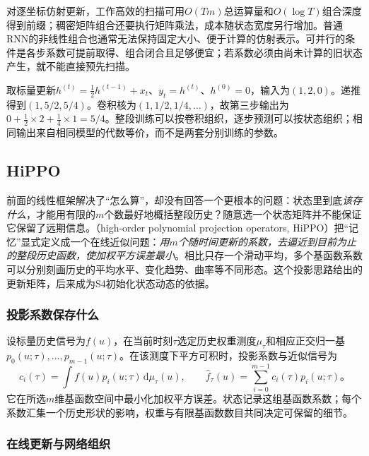 对逐坐标仿射更新，工作高效的扫描可用$O(Tm)$总运算量和$O(\log T)$组合深度得到前缀；稠密矩阵组合还要执行矩阵乘法，成本随状态宽度另行增加。普通RNN的非线性组合也通常无法保持固定大小、便于计算的仿射表示。可并行的条件是各步系数可提前取得、组合闭合且足够便宜；若系数必须由尚未计算的旧状态产生，就不能直接预先扫描。

\begin{example}[同一状态模型的递推与卷积]
  \label{ex:rnn-ssm-equivalence}
  取标量更新$h^{(t)}=\tfrac12 h^{(t-1)}+x_t$、$y_t=h^{(t)}$、$h^{(0)}=0$，输入为$(1,2,0)$。递推得到$(1,5/2,5/4)$。卷积核为$(1,1/2,1/4,\ldots)$，故第三步输出为$0+\tfrac12\times2+\tfrac14\times1=5/4$。整段训练可以按卷积组织，逐步预测可以按状态组织；相同输出来自相同模型的代数等价，而不是两套分别训练的参数。
\end{example}

\subsection{HiPPO}
\label{sec:rnn-hippo}

前面的线性框架解决了“怎么算”，却没有回答一个更根本的问题：状态里到底\emph{该存什么}，才能用有限的$m$个数最好地概括整段历史？随意选一个状态矩阵并不能保证它保留了远期信息。（high-order polynomial projection operators, HiPPO）把“记忆”显式定义成一个在线近似问题：\emph{用$m$个随时间更新的系数，去逼近到目前为止的整段历史函数，使加权平方误差最小}。相比只存一个滑动平均，多个基函数系数可以分别刻画历史的平均水平、变化趋势、曲率等不同形态。这个投影思路给出的更新矩阵，后来成为S4初始化状态动态的依据。

\subsubsection{投影系数保存什么}
\label{sec:rnn-hippo-memory}

设标量历史信号为$f(u)$，在当前时刻$\tau$选定历史权重测度$\mu_\tau$和相应正交归一基$p_0(u;\tau),\ldots,p_{m-1}(u;\tau)$。在该测度下平方可积时，投影系数与近似信号为
\begin{equation}
  c_i(\tau)=\int f(u)p_i(u;\tau)\,\mathrm{d}\mu_\tau(u),
  \qquad
  \widehat f_\tau(u)=\sum_{i=0}^{m-1}c_i(\tau)p_i(u;\tau)\text{。}
  \label{eq:rnn-hippo-projection}
\end{equation}
它在所选$m$维基函数空间中最小化加权平方误差。状态记录这组基函数系数；每个系数汇集一个历史形状的影响，权重与有限基函数数目共同决定可保留的细节。

\subsubsection{在线更新与网络组织}
\label{sec:rnn-hippo-architecture}

